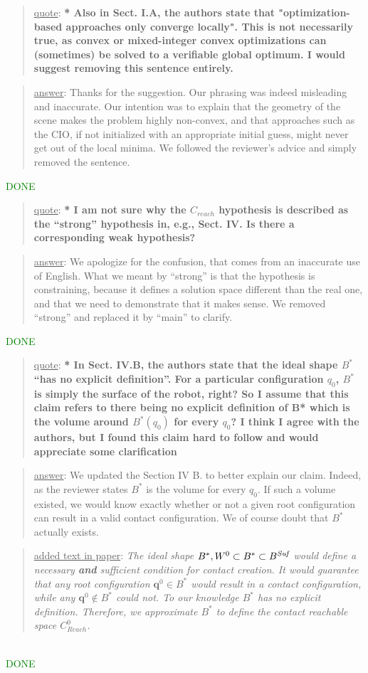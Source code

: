 \documentclass[a4paper]{article}
\newcommand{\done}[0]{\textcolor{green}{DONE}}
\newcommand\quot[1]{\begin{quote} \underline{quote}: \textbf{#1}\end{quote}}
\newcommand\as[1]{\begin{quote} \underline{answer}: {#1}\end{quote} }
\newcommand\qt[1]{\begin{quote} \underline{added text in paper}: \textit{#1}\end{quote} \leavevmode \\ }
\begin{document}
\quot{* Also in Sect. I.A, the authors state that "optimization-based
approaches only converge locally". This is not necessarily true, as
convex or mixed-integer convex optimizations can (sometimes) be solved
to a verifiable global optimum. I would suggest removing this sentence
entirely.}
\as{Thanks for the suggestion. Our phrasing was indeed misleading and inaccurate. Our intention was to explain that the geometry of the scene makes the problem highly non-convex, and
that approaches such as the CIO, if not initialized with an appropriate initial guess, might never get out of the local minima. We followed the reviewer's advice and simply removed the sentence. }\done

\quot{* I am not sure why the $C_{reach}$ hypothesis is described as the ``strong''
hypothesis in, e.g., Sect. IV. Is there a corresponding weak
hypothesis?}
\as{We apologize for the confusion, that comes from an inaccurate use of English. What we meant by ``strong'' is that the hypothesis is constraining, because
it defines a solution space different than the real one, and that we need to demonstrate that it makes sense.  We removed ``strong'' and replaced it by ``main'' to clarify. }\done

\quot{* In Sect. IV.B, the authors state that the ideal shape $B^*$ ``has no
explicit definition''. For a particular configuration  $q_0$, $B^*$ is simply
the surface of the robot, right? So I assume that this claim refers to
there being no explicit definition of B* which is the volume around
$B^*(q_0)$ for every $q_0$? I think I agree with the authors, but I found
this claim hard to follow and would appreciate some clarification}
\as{We updated the Section IV B. to better explain our claim. Indeed, as the reviewer states $B^*$  is the volume for every $q_0$. If such a volume existed, we would know exactly whether or not a given root configuration can result in a valid contact configuration.
We of course doubt that $B^*$ actually exists. }
\qt{The ideal shape $B^*, W^0 \subset B^* \subset B^{\textrm{\it Suf}}$ would define a necessary \textbf{and} sufficient condition for contact creation. 
It would guarantee that any root configuration $\mathbf{q}^{0} \in B^*$ would result in a contact configuration, while any $\mathbf{q}^{0} \notin B^*$ could not.
To our knowledge  $B^*$ has no explicit definition.
Therefore, we approximate $B^*$ to define the contact reachable space $C_{Reach}^0$.}\done
\end{document}
